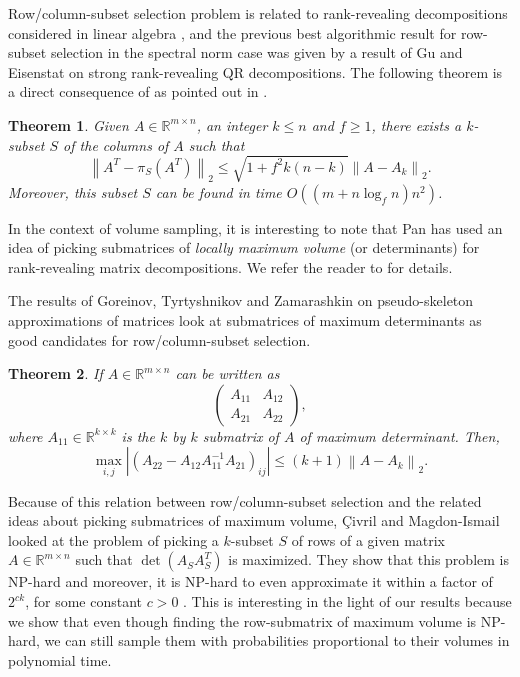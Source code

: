 \documentclass[11pt]{article}
\newtheorem{theorem}{Theorem}
\def\reals{\mathbb{R}}
\newcommand{\deter}[1]{\operatorname{det}\left(#1\right)}
\newcommand{\norm}[1]{\left\|#1\right\|}
\newcommand{\abs}[1]{\left|#1\right|}
\begin{document}
Row/column-subset selection problem is related to rank-revealing decompositions considered in linear algebra \cite{GE,P}, and the previous best algorithmic result for row-subset selection in the spectral norm case was given by a result of Gu and Eisenstat \cite{GE} on strong rank-revealing QR decompositions. The following theorem is a direct consequence of \cite{GE} as pointed out in \cite{BDM}.
\begin{theorem}
Given $A \in \reals^{m \times n}$, an integer $k \leq n$ and $f \geq 1$, there exists a $k$-subset $S$ of the columns of $A$ such that
\[
\norm{A^{T} - \pi_{S}(A^{T})}_{2} \leq \sqrt{1 + f^{2} k(n-k)} \norm{A - A_{k}}_{2}.
\]
Moreover, this subset $S$ can be found in time $O\left((m + n \log_{f}n)n^{2}\right)$.
\end{theorem}
In the context of volume sampling, it is interesting to note that Pan \cite{P} has used an idea of picking submatrices of \emph{locally maximum volume} (or determinants) for rank-revealing matrix decompositions. We refer the reader to \cite{P} for details.


The results of Goreinov, Tyrtyshnikov and Zamarashkin \cite{GT,GTZ} on pseudo-skeleton approximations of matrices look at submatrices of maximum determinants as good candidates for row/column-subset selection.
\begin{theorem} \cite{GT}
If $A \in \reals^{m \times n}$ can be written as
\[
\left(\begin{array}{cc} A_{11} & A_{12} \\ A_{21} & A_{22} \end{array}\right),
\]
where $A_{11} \in \reals^{k \times k}$ is the $k$ by $k$ submatrix of $A$ of maximum determinant. Then,
\[
\max_{i,j} \abs{(A_{22} - A_{12}A_{11}^{-1}A_{21})_{ij}} \leq (k+1) \norm{A - A_{k}}_{2}.
\]
\end{theorem}

Because of this relation between row/column-subset selection and the related ideas about picking submatrices of maximum volume, \c{C}ivril and Magdon-Ismail \cite{CM1,CM2} looked at the problem of picking a $k$-subset $S$ of rows of a given matrix $A \in \reals^{m \times n}$ such that $\deter{A_{S} A_{S}^{T}}$ is maximized. They show that this problem is NP-hard \cite{CM1} and moreover, it is NP-hard to even approximate it within a factor of $2^{ck}$, for some constant $c>0$ \cite{CM2}. This is interesting in the light of our results because we show that even though finding the row-submatrix of maximum volume is NP-hard, we can still sample them with probabilities proportional to their volumes in polynomial time.
\end{document}
